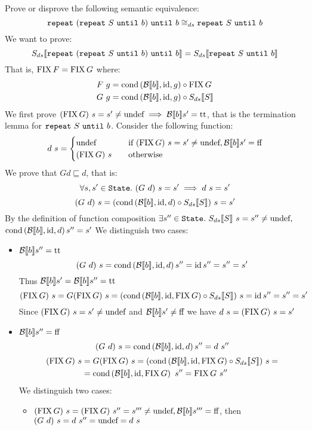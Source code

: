 \begin{exercise}{
    Prove or disprove the following semantic equivalence:
    \[ \wrepeat{(\wrepeat{S}{b})}{b} \DScong \wrepeat{S}{b} \]
}
    We want to prove:
    \[ \Sds{\wrepeat{(\wrepeat{S}{b})}{b}} = \Sds{\wrepeat{S}{b}} \]
    That is, $\FIX F = \FIX G$ where:
    \begin{align*}
        F\ g &= \cond{\Bool{b}}{\id}{g} \circ \FIX G \\
        G\ g &= \cond{\Bool{b}}{\id}{g} \circ \Sds{S}
    \end{align*}
    We first prove $(\FIX G)\ s = s' \neq \undef \implies \Bool{b} s' = \True$, that is the termination lemma for $\wrepeat{S}{b}$.
    Consider the following function:
    \[
        d\ s = \begin{cases}
            \undef &\quad \text{if } (\FIX G)\ s = s' \neq \undef, \Bool{b} s' = \False \\
            (\FIX G)\ s &\quad \text{otherwise}
        \end{cases}
    \]
    We prove that $G d \sqsubseteq d$, that is:
    \[ \forall s, s' \in \State.\ (G\ d)\ s = s' \implies d\ s = s' \]
    \[ (G\ d)\ s = (\cond{\Bool{b}}{\id}{d} \circ \Sds{S})\ s = s' \]
    By the definition of function composition $\exists s'' \in \State.\ \Sds{S}\ s = s'' \neq \undef,$ \\ $\cond{\Bool{b}}{\id}{d} s'' = s'$
    We distinguish two cases:
    \begin{itemize}
        \item $\Bool{b} s'' = \True$
            \[ (G\ d)\ s = \cond{\Bool{b}}{\id}{d} s'' = \id s'' = s'' = s' \]
            Thus $\Bool{b} s' = \Bool{b} s'' = \True$
            \[ (\FIX G)\ s = G(\FIX G)\ s = (\cond{\Bool{b}}{\id}{\FIX G} \circ \Sds{S})\ s = \id s'' = s'' = s' \]
            Since $(\FIX G)\ s = s' \neq \undef$ and $\Bool{b} s' \neq \False$ we have $d\ s = (\FIX G)\ s = s'$
        \item $\Bool{b} s'' = \False$
            \[ (G\ d)\ s = \cond{\Bool{b}}{\id}{d} s'' = d\ s'' \]
            \begin{align*}
                (\FIX G)\ s &= G(\FIX G)\ s = (\cond{\Bool{b}}{\id}{\FIX G} \circ \Sds{S})\ s = \\
                &= \cond{\Bool{b}}{\id}{\FIX G}\ s'' = \FIX G\ s''
            \end{align*}
            We distinguish two cases:
            \begin{itemize}
                \item $(\FIX G)\ s = (\FIX G)\ s'' = s''' \neq \undef, \Bool{b} s''' = \False$, then $(G\ d)\ s = d\ s'' = \undef = d\ s$

\end{itemize}
\end{itemize}
\end{exercise}
